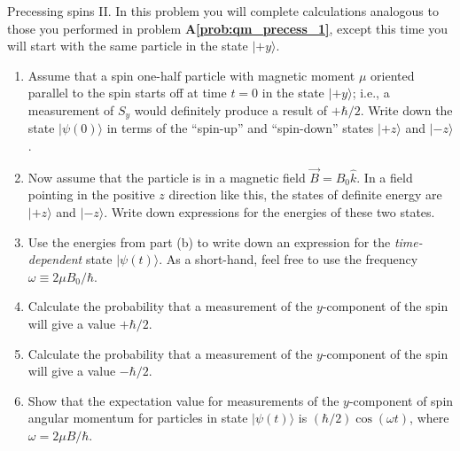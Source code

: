 \newpage

\begin{aproblem}{Precessing spins II.}  
  In this problem you will complete calculations analogous to those
  you performed in problem {\bf A\ref{prob:qm_precess_1}}, except this
  time you will start with the same particle in the state
  $|\mbox{$+y$}\rangle$.

  \begin{enumerate}

  \item Assume that a spin one-half particle with magnetic moment
    $\mu$ oriented parallel to the spin starts off at time $t=0$ in
    the state $|\mbox{$+y$}\rangle$; i.e., a measurement of $S_y$
    would definitely produce a result of $+\hbar /2$.  Write down the
    state $|\psi(0)\rangle$ in terms of the ``spin-up'' and
    ``spin-down'' states $|\mbox{$+z$}\rangle$ and
    $|\mbox{$-z$}\rangle$.

  \item Now assume that the particle is in a magnetic field
    $\vec{B}=B_0 \widehat{k}$.  In a field pointing in the positive
    $z$ direction like this, the states of definite energy are
    $|\mbox{$+z$}\rangle$ and $|\mbox{$-z$}\rangle$.  Write down
    expressions for the energies of these two states.

  \item Use the energies from part (b) to write down an expression for
    the {\em time-dependent} state $|\psi(t)\rangle$.  As a
    short-hand, feel free to use the frequency $\omega \equiv 2\mu
    B_0/\hbar$.

  \item Calculate the probability that a measurement of the
    $y$-component of the spin will give a value $+\hbar/2$.
    
  \item Calculate the probability that a measurement of the
    $y$-component of the spin will give a value $-\hbar/2$.

  \item Show that the expectation value for measurements of the
    $y$-com\-ponent of spin angular momentum for particles in state
    $|\psi(t)\rangle$ is $(\hbar/2)\cos(\omega t)$, where $\omega =
    2\mu B/\hbar$.

  \end{enumerate}
\end{aproblem}

\newpage

